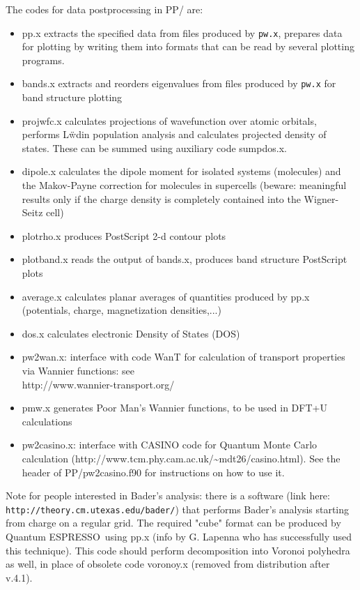 \documentclass[12pt,a4paper]{article}
\def\qe{{\sc Quantum ESPRESSO}}
\def\pw.x{\texttt{pw.x}}
\begin{document}
The codes for data postprocessing in PP/ are:
\begin{itemize}
\item pp.x extracts the specified data from files produced by \pw.x,
  prepares data for plotting by writing them into formats that can be
  read by several plotting programs. 
\item bands.x extracts and reorders eigenvalues from files produced by
  \pw.x for band structure plotting 
\item projwfc.x calculates projections of wavefunction over atomic
  orbitals, performs L\"wdin population analysis and calculates
  projected density of states. These can be summed using auxiliary
  code sumpdos.x. 
\item dipole.x calculates the dipole moment for isolated systems
  (molecules) and the Makov-Payne correction for molecules in
  supercells (beware: meaningful results only if the charge density is
  completely contained into the Wigner-Seitz cell) 
\item plotrho.x produces PostScript 2-d contour plots
\item plotband.x reads the output of bands.x, produces band structure
  PostScript plots
\item average.x calculates planar averages of quantities produced by
  pp.x (potentials, charge, magnetization densities,...) 
\item dos.x calculates electronic Density of States (DOS)
\item pw2wan.x: interface with code WanT for calculation of transport
  properties via Wannier functions: see \\
  http://www.wannier-transport.org/ 
\item pmw.x generates Poor Man's Wannier functions, to be used in
  DFT+U calculations 
\item pw2casino.x: interface with CASINO code for Quantum Monte Carlo
  calculation (http://www.tcm.phy.cam.ac.uk/\~{}mdt26/casino.html).
  See the header of PP/pw2casino.f90 for instructions on how to use it.
\end{itemize}
Note for people interested in Bader's analysis: there is a software
(link here: \texttt{http://theory.cm.utexas.edu/bader/}) that performs
Bader's analysis starting from charge on a regular grid. The required 
"cube" format can be produced by \qe\ using pp.x (info by G. Lapenna
who has successfully used this technique). This code should perform 
decomposition into Voronoi polyhedra as well, in place of obsolete
code voronoy.x (removed from distribution after v.4.1).
\end{document}
